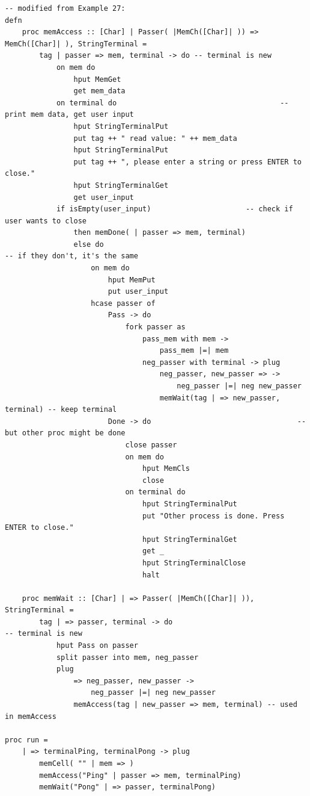 \documentclass[acmsmall]{acmart}
\begin{document}
\begin{appendix}
\begin{lstlisting}
-- modified from Example 27:
defn
	proc memAccess :: [Char] | Passer( |MemCh([Char]| )) => MemCh([Char]| ), StringTerminal =
		tag | passer => mem, terminal -> do	-- terminal is new
			on mem do
				hput MemGet
				get mem_data
			on terminal do										-- print mem data, get user input
				hput StringTerminalPut
				put tag ++ " read value: " ++ mem_data
				hput StringTerminalPut
				put tag ++ ", please enter a string or press ENTER to close."
				hput StringTerminalGet
				get user_input
			if isEmpty(user_input)						-- check if user wants to close
				then memDone( | passer => mem, terminal)
				else do													-- if they don't, it's the same
					on mem do
						hput MemPut
						put user_input
					hcase passer of 
						Pass -> do
							fork passer as
								pass_mem with mem -> 
									pass_mem |=| mem
								neg_passer with terminal -> plug
									neg_passer, new_passer => ->		
										neg_passer |=| neg new_passer
									memWait(tag | => new_passer, terminal) -- keep terminal
						Done -> do									-- but other proc might be done
							close passer
							on mem do
								hput MemCls
								close
							on terminal do
								hput StringTerminalPut
								put "Other process is done. Press ENTER to close."
								hput StringTerminalGet
								get _
								hput StringTerminalClose
								halt
		
	proc memWait :: [Char] | => Passer( |MemCh([Char]| )), StringTerminal =
		tag | => passer, terminal -> do									 -- terminal is new
			hput Pass on passer
			split passer into mem, neg_passer
			plug
				=> neg_passer, new_passer -> 
					neg_passer |=| neg new_passer
				memAccess(tag | new_passer => mem, terminal) -- used in memAccess

proc run =
	| => terminalPing, terminalPong -> plug 
		memCell( "" | mem => )
		memAccess("Ping" | passer => mem, terminalPing)
		memWait("Pong" | => passer, terminalPong)
\end{lstlisting}



\end{appendix}
\end{document}
